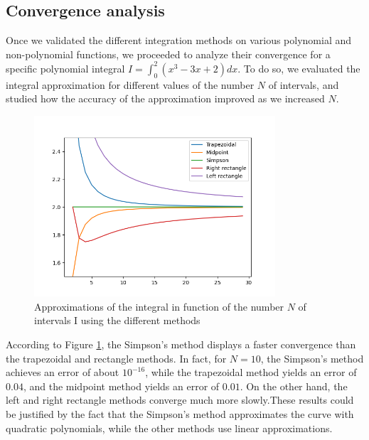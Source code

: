\subsection{Convergence analysis}
Once we validated the different integration methods on various polynomial and non-polynomial functions, we proceeded to analyze their convergence for a specific polynomial integral $ I = \int_{0}^{2}(x^{3} -3x +2)dx$. To do so, we evaluated the integral approximation for different values of the number $N$ of intervals, and studied how the accuracy of the approximation improved as we increased $N$. \\
\begin{figure}[h]
  \centering
  \includegraphics[width=0.8\textwidth]{tex/speed_convergence.png}
  \caption{Approximations of the integral in function of the number $N$ of intervals I using the different methods }
  \label{fig:speed}
\end{figure}
According to Figure \ref{fig:speed}, the Simpson's method displays a faster convergence than the trapezoidal and rectangle methods. In fact, for $N=10$, the Simpson's method achieves an error of about $10^{-16}$, while the trapezoidal method yields an error of $0.04$, and the midpoint method yields an error of $0.01$. On the other hand, the left and right rectangle methods converge much more slowly.These results could be justified by the fact that the Simpson's method approximates the curve with quadratic polynomials, while the other methods use linear approximations.
